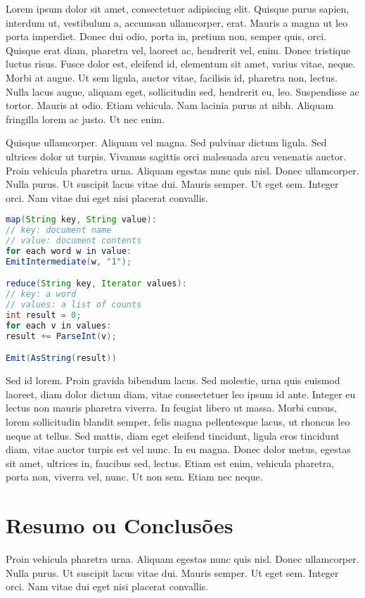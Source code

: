 Lorem ipsum dolor sit amet, consectetuer adipiscing elit. Quisque
purus sapien, interdum ut, vestibulum a, accumsan ullamcorper,
erat. Mauris a magna ut leo porta imperdiet. Donec dui odio, porta in,
pretium non, semper quis, orci. Quisque erat diam, pharetra vel,
laoreet ac, hendrerit vel, enim. Donec tristique luctus risus. Fusce
dolor est, eleifend id, elementum sit amet, varius vitae, neque. Morbi
at augue. Ut sem ligula, auctor vitae, facilisis id, pharetra non,
lectus. Nulla lacus augue, aliquam eget, sollicitudin sed, hendrerit
eu, leo. Suspendisse ac tortor. Mauris at odio. Etiam vehicula. Nam
lacinia purus at nibh. Aliquam fringilla lorem ac justo. Ut nec
enim. 

Quisque ullamcorper. Aliquam vel magna. Sed pulvinar dictum
ligula. Sed ultrices dolor ut turpis. Vivamus sagittis orci malesuada
arcu venenatis auctor. Proin vehicula pharetra urna. Aliquam egestas
nunc quis nisl. Donec ullamcorper. Nulla purus. Ut suscipit lacus
vitae dui. Mauris semper. Ut eget sem. Integer orci. Nam vitae dui
eget nisi placerat convallis. 

\begin{lstlisting}[float,language=Java, label=src:mapreduce, caption=Example map and reduce functions for word counting]
map(String key, String value): 
// key: document name 
// value: document contents 
for each word w in value:
EmitIntermediate(w, "1");

reduce(String key, Iterator values):
// key: a word 
// values: a list of counts 
int result = 0;
for each v in values: 
result += ParseInt(v);

Emit(AsString(result))
\end{lstlisting}

Sed id lorem. Proin gravida bibendum lacus. Sed molestie, urna quis
euismod laoreet, diam dolor dictum diam, vitae consectetuer leo ipsum
id ante. Integer eu lectus non mauris pharetra viverra. In feugiat
libero ut massa. Morbi cursus, lorem sollicitudin blandit semper,
felis magna pellentesque lacus, ut rhoncus leo neque at tellus. Sed
mattis, diam eget eleifend tincidunt, ligula eros tincidunt diam,
vitae auctor turpis est vel nunc. In eu magna. Donec dolor metus,
egestas sit amet, ultrices in, faucibus sed, lectus. Etiam est enim,
vehicula pharetra, porta non, viverra vel, nunc. Ut non sem. Etiam nec
neque. 

\section{Resumo ou Conclusões}

Proin vehicula pharetra urna. Aliquam egestas
nunc quis nisl. Donec ullamcorper. Nulla purus. Ut suscipit lacus
vitae dui. Mauris semper. Ut eget sem. Integer orci. Nam vitae dui
eget nisi placerat convallis. 
